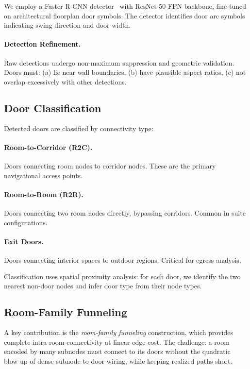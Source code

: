 \documentclass[manuscript,screen,review]{acmart}
\begin{document}
We employ a Faster R-CNN detector~\cite{faster_rcnn} with ResNet-50-FPN backbone, fine-tuned on architectural floorplan door symbols. The detector identifies door arc symbols indicating swing direction and door width.


\paragraph{Detection Refinement.} Raw detections undergo non-maximum suppression and geometric validation. Doors must: (a) lie near wall boundaries, (b) have plausible aspect ratios, (c) not overlap excessively with other detections.

\subsection{Door Classification}
\label{subsec:door_classification}

Detected doors are classified by connectivity type:

\paragraph{Room-to-Corridor (R2C).} Doors connecting room nodes to corridor nodes. These are the primary navigational access points.

\paragraph{Room-to-Room (R2R).} Doors connecting two room nodes directly, bypassing corridors. Common in suite configurations.

\paragraph{Exit Doors.} Doors connecting interior spaces to outdoor regions. Critical for egress analysis.

Classification uses spatial proximity analysis: for each door, we identify the two nearest non-door nodes and infer door type from their node types.

\subsection{Room-Family Funneling}
\label{subsec:funneling}

A key contribution is the \emph{room-family funneling} construction, which provides complete intra-room connectivity at linear edge cost. The challenge: a room encoded by many subnodes must connect to its doors without the quadratic blow-up of dense subnode-to-door wiring, while keeping realized paths short.
\end{document}

